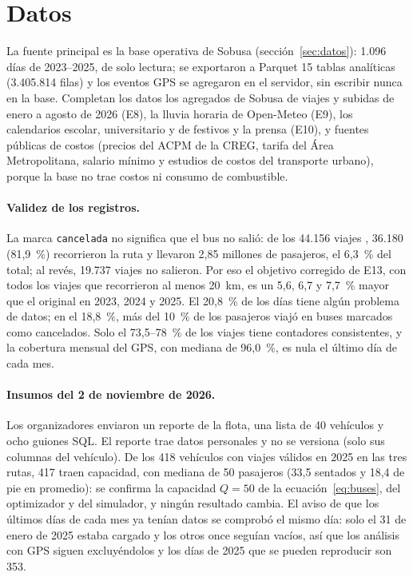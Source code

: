 \section{Datos}
\label{sec:datos-fuentes}

La fuente principal es la base operativa de Sobusa (sección~\ref{sec:datos}): 1.096 días de 2023--2025, de solo
lectura; se exportaron a Parquet 15 tablas analíticas (3.405.814 filas) y los eventos GPS se agregaron en el servidor,
sin escribir nunca en la base. Completan los datos los
agregados de Sobusa de viajes y subidas de enero a agosto de 2026 (E8), la lluvia horaria de Open-Meteo
\citep{zippenfenig2023openmeteo} (E9), los calendarios escolar, universitario y de festivos y la prensa (E10), y fuentes
públicas de costos (precios del ACPM de la CREG, tarifa del Área Metropolitana, salario mínimo y estudios de costos
del transporte urbano), porque la base no trae costos ni consumo de combustible.

\paragraph{Validez de los registros.} La marca \texttt{cancelada} no significa que el bus no salió: de los 44.156
viajes , 36.180 (81,9~\%) recorrieron la ruta y llevaron 2,85 millones de pasajeros,
el 6,3~\% del total; al revés, 19.737 viajes  no salieron. Por eso el objetivo corregido de E13, con
todos los viajes que recorrieron al menos 20~km, es un 5,6, 6,7 y 7,7~\% mayor que el original en 2023, 2024 y 2025.
El 20,8~\% de los días tiene algún problema de datos; en el 18,8~\%, más del 10~\% de los pasajeros viajó en buses
marcados como cancelados. Solo el 73,5--78~\% de los viajes tiene contadores consistentes, y la cobertura mensual del
GPS, con mediana de 96,0~\%, es nula el último día de cada mes.

\paragraph{Insumos del 2 de noviembre de 2026.} Los organizadores enviaron un reporte de la flota, una lista de 40
vehículos y ocho guiones SQL. El reporte trae datos personales y no se versiona (solo sus columnas del vehículo). De
los 418 vehículos con viajes válidos en 2025 en las tres rutas, 417 traen capacidad, con mediana de 50 pasajeros (33,5
sentados y 18,4 de pie en promedio): se confirma la capacidad $Q = 50$ de la ecuación~\eqref{eq:buses}, del
optimizador y del simulador, y ningún resultado cambia. El aviso de que los últimos días de cada mes ya tenían datos se
comprobó el mismo día: solo el 31 de enero de 2025 estaba cargado y los otros once seguían vacíos, así que los análisis con GPS siguen
excluyéndolos y los días de 2025 que se pueden reproducir son 353.
